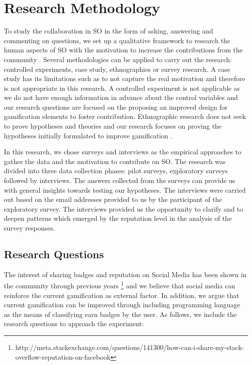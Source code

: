 \documentclass{sigchi}
\begin{document}
\section{Research Methodology}
To study the collaboration in SO in the form of asking, answering and commenting on questions, we set up a qualitative framework to research the human aspects of SO with the motivation to increase the contributions from the community \cite{Easterbrook}. Several methodologies can be applied to carry out the research: controlled experiments, case study, ethnographies or survey research. A case study has its limitations such as to not capture the real motivation and therefore is not appropriate in this research. A controlled experiment is not applicable as we do not have enough information in advance about the control variables and our research questions are focused on the proposing an improved design for gamification elements to foster contribution. Ethnographic research does not seek to prove hypotheses and theories and our research focuses on proving the hypotheses initially formulated to improve gamification \cite{Easterbrook}.

In this research, we chose surveys and interviews as the empirical approaches to gather the data and the motivation to contribute on SO. The research was divided into three data collection phases: pilot surveys, exploratory surveys followed by interviews. The answers collected from the surveys can provide us with general insights towards testing our hypotheses. The interviews were carried out based on the email addresses provided to us by the participant of the exploratory survey. The interviews provided us the opportunity to clarify and to deepen patterns which emerged by the reputation level in the analysis of the survey responses.

\subsection{Research Questions}
The interest of sharing badges and reputation on Social Media has been shown in the community through previous years \footnote{http://meta.stackexchange.com/questions/141300/how-can-i-share-my-stack-overflow-reputation-on-facebook} and we believe that social media can reinforce the current gamification as external factor. In addition, we argue that current gamification can be improved through including programming language as the means of classifying earn badges by the user. As follows, we include the research questions to approach the experiment:
\end{document}
